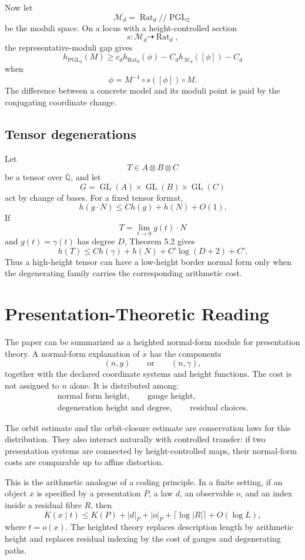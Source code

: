 \documentclass[11pt]{article}
\DeclareMathOperator{\GL}{GL}
\DeclareMathOperator{\PGL}{PGL}
\DeclareMathOperator{\Rat}{Rat}
\begin{document}
Now let
\[
\mathcal M_d=\Rat_d /\!/\PGL_2
\]
be the moduli space. On a locus with a height-controlled section
\[
s:\mathcal M_d\dashrightarrow\Rat_d,
\]
the representative-moduli gap gives
\[
h_{\PGL_2}(M)
\geq
c_d h_{\Rat_d}(\phi)
-C_d h_{\mathcal M_d}([\phi])
-C_d
\]
when
\[
\phi=M^{-1}\circ s([\phi])\circ M.
\]
The difference between a concrete model and its moduli point is paid by the conjugating coordinate change.

\subsection{Tensor degenerations}

Let
\[
T\in A\otimes B\otimes C
\]
be a tensor over \(\overline{\mathbb Q}\), and let
\[
G=\GL(A)\times\GL(B)\times\GL(C)
\]
act by change of bases. For a fixed tensor format,
\[
h(g\cdot N)\leq C h(g)+h(N)+O(1).
\]
If
\[
T=\lim_{t\to0}g(t)\cdot N
\]
and \(g(t)=\gamma(t)\) has degree \(D\), Theorem 5.2 gives
\[
h(T)\leq C h(\gamma)+h(N)+C'\log(D+2)+C'.
\]
Thus a high-height tensor can have a low-height border normal form only when the degenerating family carries the corresponding arithmetic cost.

\section{Presentation-Theoretic Reading}

The paper can be summarized as a heighted normal-form module for presentation theory. A normal-form explanation of \(x\) has the components
\[
(n,g)
\qquad\text{or}\qquad
(n,\gamma),
\]
together with the declared coordinate systems and height functions. The cost is not assigned to \(n\) alone. It is distributed among:
\[
\begin{gathered}
\text{normal form height},\qquad
\text{gauge height},\\
\text{degeneration height and degree},\qquad
\text{residual choices}.
\end{gathered}
\]

The orbit estimate and the orbit-closure estimate are conservation laws for this distribution. They also interact naturally with controlled transfer: if two presentation systems are connected by height-controlled maps, their normal-form costs are comparable up to affine distortion.

This is the arithmetic analogue of a coding principle. In a finite setting, if an object \(x\) is specified by a presentation \(P\), a law \(d\), an observable \(o\), and an index inside a residual fibre \(R\), then
\[
K(x\mid t)
\leq
K(P)+|d|_P+|o|_P+\lceil\log |R|\rceil+O(\log L),
\]
where \(t=o(x)\). The heighted theory replaces description length by arithmetic height and replaces residual indexing by the cost of gauges and degenerating paths.
\end{document}
